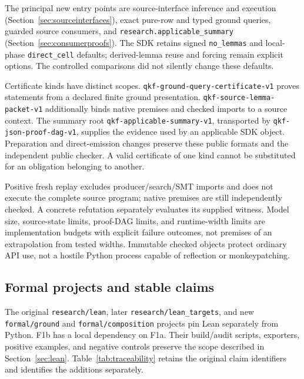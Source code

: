 The principal new entry points are source-interface inference and execution (Section~\ref{sec:sourceinterfaces}), exact pure-row and typed ground queries, guarded source consumers, and \texttt{research.applicable\_summary} (Section~\ref{sec:consumerproofs}). The SDK retains signed \texttt{no\_lemmas} and local-phase \texttt{direct\_cell} defaults; derived-lemma reuse and forcing remain explicit options. The controlled comparisons did not silently change these defaults.

Certificate kinds have distinct scopes. \texttt{qkf-ground-query-certificate-v1} proves statements from a declared finite ground presentation. \texttt{qkf-source-lemma-packet-v1} additionally binds native premises and checked imports to a source context. The summary root \texttt{qkf-applicable-summary-v1}, transported by \texttt{qkf-json-proof-dag-v1}, supplies the evidence used by an applicable SDK object. Preparation and direct-emission changes preserve these public formats and the independent public checker. A valid certificate of one kind cannot be substituted for an obligation belonging to another.

Positive fresh replay excludes producer/search/SMT imports and does not execute the complete source program; native premises are still independently checked. A concrete refutation separately evaluates its supplied witness. Model size, source-state limits, proof-DAG limits, and runtime-width limits are implementation budgets with explicit failure outcomes, not premises of an extrapolation from tested widths. Immutable checked objects protect ordinary API use, not a hostile Python process capable of reflection or monkeypatching.

\subsection{Formal projects and stable claims}
The original \texttt{research/lean}, later \texttt{research/lean\_targets}, and new \texttt{formal/ground} and \texttt{formal/composition} projects pin Lean separately from Python. F1b has a local dependency on F1a. Their build/audit scripts, exporters, positive examples, and negative controls preserve the scope described in Section~\ref{sec:lean}. Table~\ref{tab:traceability} retains the original claim identifiers and identifies the additions separately.

